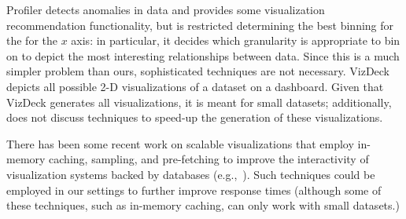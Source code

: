 Profiler 
detects anomalies in data \cite{DBLP:conf/avi/KandelPPHH12} and provides
some visualization recommendation functionality,
but is restricted determining the best binning for the
for the $x$ axis: in particular, it decides which granularity
is appropriate to bin on to depict the most interesting relationships 
between data. 
Since this is a much simpler problem
than ours, sophisticated techniques are not necessary.
VizDeck~\cite{DBLP:conf/sigmod/KeyHPA12}
depicts all possible 2-D visualizations of a dataset on a dashboard.
Given that VizDeck generates all visualizations, it is  meant for 
small datasets; additionally, \cite{DBLP:conf/sigmod/KeyHPA12} does not discuss techniques
to speed-up the generation of these visualizations. 


  There has been some recent work on
scalable visualizations that employ in-memory caching, sampling, and
pre-fetching to improve the interactivity of visualization systems
backed by
databases (e.g.,~\cite{doshi2003prefetching,DBLP:journals/corr/KimBPIMR14}).
Such techniques could be employed in our settings to further improve
response times (although some of these techniques, such as in-memory caching,
can only work with small datasets.)



